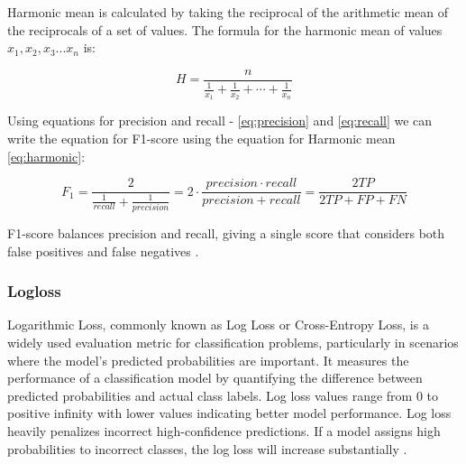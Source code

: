Harmonic mean is calculated by taking the reciprocal of the arithmetic mean of the reciprocals of a set of values. The formula for the harmonic mean of values $x_1,x_2,x_3...x_n$ is:

\begin{equation}\label{eq:harmonic}
    H=\dfrac{n}{\frac{1}{x_1}+\frac{1}{x_2}+\cdots+\frac{1}{x_n}}
\end{equation}

Using equations for precision and recall - \autoref{eq:precision} and \autoref{eq:recall} we can write the equation for F1-score using the equation for Harmonic mean \autoref{eq:harmonic}:

\begin{equation}
    \label{eq:f1}
    F_1 = \dfrac{2}{\frac{1}{recall}+\frac{1}{precision}}=2\cdot\dfrac{precision\cdot recall}{precision+recall}= \dfrac{2TP}{2TP+FP+FN}
\end{equation}

F1-score balances precision and recall, giving a single score that considers both false positives and false negatives \citep{Tharwat2021}.

\subsubsection{Logloss}

Logarithmic Loss, commonly known as Log Loss or Cross-Entropy Loss, is a widely used evaluation metric for classification problems, particularly in scenarios where the model's predicted probabilities are important. It measures the performance of a classification model by quantifying the difference between predicted probabilities and actual class labels. Log loss values range from 0 to positive infinity with lower values indicating better model performance. Log loss heavily penalizes incorrect high-confidence predictions. If a model assigns high probabilities to incorrect classes, the log loss will increase substantially \citep{sklearn_api}.





